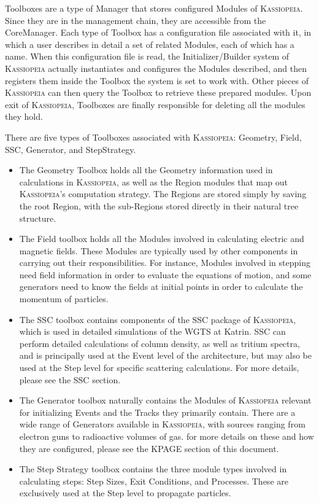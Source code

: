 Toolboxes are a type of Manager that stores configured Modules of \textsc{Kassiopeia}.  Since they are in the management chain, they are accessible from the CoreManager.  Each type of Toolbox has a configuration file associated with it, in which a user describes in detail a set of related Modules, each of which has a name.  When this configuration file is read, the Initializer/Builder system of \textsc{Kassiopeia} actually instantiates and configures the Modules described, and then registers them inside the Toolbox the system is set to work with. Other pieces of \textsc{Kassiopeia} can then query the Toolbox to retrieve these prepared modules.  Upon exit of \textsc{Kassiopeia}, Toolboxes are finally responsible for deleting all the modules they hold.

There are five types of Toolboxes associated with \textsc{Kassiopeia}:  Geometry, Field, SSC, Generator, and StepStrategy.  

\begin{itemize}

\item The Geometry Toolbox holds all the Geometry information used in calculations in \textsc{Kassiopeia}, as well as the Region modules that map out \textsc{Kassiopeia}'s computation strategy.  The Regions are stored simply by saving the root Region, with the sub-Regions stored directly in their natural tree structure.

\item The Field toolbox holds all the Modules involved in calculating electric and magnetic fields.  These Modules are typically used by other components in carrying out their responsibilities.  For instance, Modules involved in stepping need field information in order to evaluate the equations of motion, and some generators need to know the fields at initial points in order to calculate the momentum of particles.  

\item The SSC toolbox contains components of the SSC package of \textsc{Kassiopeia}, which is used in detailed simulations of the WGTS at Katrin.  SSC can perform detailed calculations of column density, as well as tritium spectra, and is principally used at the Event level of the architecture, but may also be used at the Step level for specific scattering calculations.  For more details, please see the SSC section.

\item The Generator toolbox naturally contains the Modules of \textsc{Kassiopeia} relevant for initializing Events and the Tracks they primarily contain.  There are a wide range of Generators available in \textsc{Kassiopeia}, with sources ranging from electron guns to radioactive volumes of gas. for more details on these and how they are configured, please see the KPAGE section of this document.  

\item The Step Strategy toolbox contains the three module types involved in calculating steps:  Step Sizes, Exit Conditions, and Processes.  These are exclusively used at the Step level to propagate particles.

\end{itemize}

